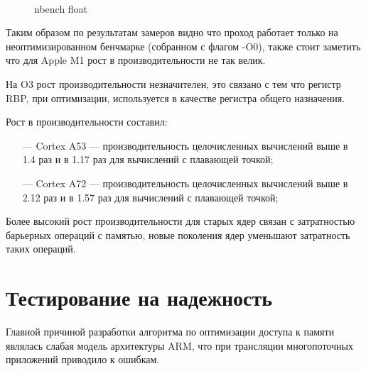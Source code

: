 \begin{figure}[hbtp]
	\centering
	\\
	\caption{nbench float}
	\label{fig:speed}
\end{figure}

\newpage

Таким образом по результатам замеров видно что проход работает только на неоптимизированном бенчмарке (собранном с флагом -O0), также стоит заметить что для Apple M1 рост в производительности не так велик.

На O3 рост производительности незначителен, это связано с тем что регистр RBP, при оптимизации, используется в качестве регистра общего назначения.

Рост в производительности составил:
\begin{itemize}[leftmargin=1.6\parindent]
	\item[---] Cortex A53 --- производительность целочисленных вычислений выше в 1.4 раз и в 1.17 раз для вычислений с плавающей точкой;
	\item[---] Cortex A72 --- производительность целочисленных вычислений выше в 2.12 раз и в 1.57 раз для вычислений с плавающей точкой;
\end{itemize}

Более высокий рост производительности для старых ядер связан с затратностью барьерных операций с памятью, новые поколения ядер уменьшают затратность таких операций.

\section{Тестирование на надежность}

Главной причиной разработки алгоритма по оптимизации доступа к памяти являлась слабая модель архитектуры ARM, что при трансляции многопоточных приложений приводило к ошибкам.

